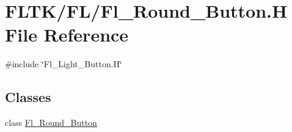 \hypertarget{_fl___round___button_8_h}{}\section{F\+L\+T\+K/\+F\+L/\+Fl\+\_\+\+Round\+\_\+\+Button.H File Reference}
\label{_fl___round___button_8_h}
{\ttfamily \#include \char`\"{}Fl\+\_\+\+Light\+\_\+\+Button.\+H\char`\"{}}\newline
\subsection*{Classes}
\begin{DoxyCompactItemize}
\item 
class \hyperlink{class_fl___round___button}{Fl\+\_\+\+Round\+\_\+\+Button}
\end{DoxyCompactItemize}
